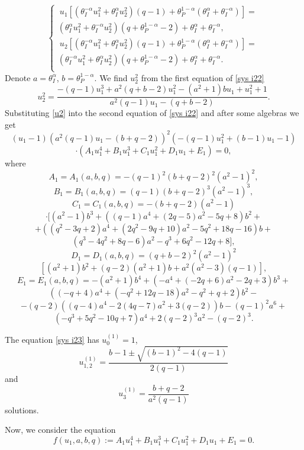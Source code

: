 \documentclass[sn-mathphys]{sn-jnl}%
\theoremstyle{thmstyleone}%
\theoremstyle{thmstyletwo}%
\theoremstyle{thmstylethree}%
\begin{document}
\begin{equation}\label{sys i22}
\left\{
\begin{array}{llll}
\ u_{1}\left[(\theta_I^{-\alpha}u_1^2+\theta_I^{\alpha}u_2^2)(q-1)+\theta_P^{1-\alpha}(\theta_I^{\alpha}+\theta_I^{-\alpha})\right]=\\
(\theta_I^{\alpha}u_1^2+\theta_I^{-\alpha}u_2^2)(q+\theta_P^{1-\alpha}-2)+\theta_I^{\alpha}+\theta_I^{-\alpha},\\[3mm]
\ u_{2}\left[(\theta_I^{-\alpha}u_1^2+\theta_I^{\alpha}u_2^2)(q-1)+\theta_P^{1-\alpha}(\theta_I^{\alpha}+\theta_I^{-\alpha})\right]=\\
(\theta_I^{-\alpha}u_1^2+\theta_I^{\alpha}u_2^2)(q+\theta_P^{1-\alpha}-2)+\theta_I^{\alpha}+\theta_I^{-\alpha}.\\[3mm]
\end{array}\right.
\end{equation}
Denote $a=\theta_I^{\alpha}$, $b=\theta_P^{1-\alpha}$.
We find $u_2^2$ from the first equation of \eqref{sys i22}
\begin{equation}\label{u2}
u_2^2=\frac{-(q-1)u_1^3+a^2(q+b-2)u_1^2-(a^2+1)bu_1+u_1^2+1}{a^2(q-1)u_1-(q+b-2)}.
\end{equation}
Substituting \eqref{u2} into the second equation of \eqref{sys i22} and after some algebras we get
$$
(u_1-1)(a^2(q-1)u_1-(b+q-2))^2(-(q-1)u_1^2+(b-1)u_1-1)$$
\begin{equation}\label{sys i23}\cdot(A_1u_1^4+B_1u_1^3+C_1u_1^2+D_1u_1+E_1)=0,
\end{equation}
where $$A_1=A_1(a,b,q)=-(q-1)^2(b+q-2)^2(a^2-1)^2,$$ $$B_1=B_1(a,b,q)=(q-1)(b+q-2)^3(a^2-1)^3,$$
$$C_1=C_1(a,b,q)=-(b+q-2)(a^2-1)$$
$$\cdot[(a^2-1)b^3+((q-1)a^4+(2q-5)a^2-5q+8)b^2+$$
$$+((q^2-3q+2)a^4+(2q^2-9q+10)a^2-5q^2+18q-16)b+$$$$(q^3-4q^2+8q-6)a^2-q^3+6q^2-12q+8],$$
$$D_1=D_1(a,b,q)=(q+b-2)^2(a^2-1)^2$$$$[(a^2+1)b^2+(q-2)(a^2+1)b+a^2(a^2-3)(q-1)],$$
$$E_1=E_1(a,b,q)=-(a^2+1)b^4+(-a^4+(-2q+6)a^2-2q+3)b^3+$$$$((-q+4)a^4+(-q^2+12q-18)a^2-q^2+q+2)b^2-$$
$$-(q-2)((q-4)a^4-2(4q-7)a^2+3(q-2))b-(q-1)^2a^6+$$$$(-q^3+5q^2-10q+7)a^4+2(q-2)^3a^2-(q-2)^3.$$

The equation \eqref{sys i23} has $u_0^{(1)}=1$, $$u_{1,2}^{(1)}=\frac{b-1\pm\sqrt{(b-1)^2-4(q-1)}}{2(q-1)}$$ and $$u_3^{(1)}=\frac{b+q-2}{a^2(q-1)}$$ solutions.

Now, we consider the equation
\begin{equation}\label{sys i24}
f(u_1, a,b,q):=A_1u_1^4+B_1u_1^3+C_1u_1^2+D_1u_1+E_1=0.
\end{equation}
\end{document}
